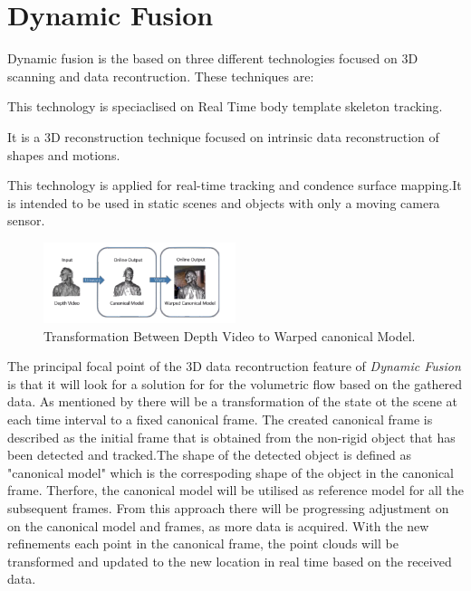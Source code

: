 \documentclass[12pt]{report}
\begin{document}
\section{Dynamic Fusion}
Dynamic fusion is the based on three different technologies focused on 3D scanning and data recontruction. These techniques are: 

\begin{description}[style=nextline]
    \item[DART (Dense Articulated Real Time Tracking)] This technology is speciaclised  on Real Time body template skeleton tracking.
    \item[Animation Cartography] It is a 3D reconstruction technique  focused on intrinsic data reconstruction of shapes and motions. 
    \item[Kinect Fusion] This technology is applied for real-time tracking and condence surface mapping.It is intended to be used in static scenes and objects with only a moving camera sensor. 
\end{description} 

\vspace{5mm}

\begin{figure} %
    \centering
    \includegraphics[width=0.5\textwidth]{IMG_0073.png}
    \caption{Transformation Between Depth Video to Warped canonical Model. \cite[]{newcombe_fox_seitz_2015}}
\end{figure}
The principal  focal point of the 3D data recontruction feature of \textit{Dynamic Fusion}  is that it will look for a solution for for the volumetric flow based on the gathered data.
As mentioned by  there will be a transformation of the state ot the scene at each time interval to a fixed canonical frame.
The created  canonical frame is described as the initial frame that is obtained from the non-rigid object that has been detected and tracked.The shape of the detected object is defined as "canonical model" which is the correspoding shape of the object in the canonical frame. 
Therfore, the canonical model will be utilised as reference model for all the subsequent frames. From this approach there will be progressing adjustment on on the canonical model and frames, as more data is acquired.
With the new refinements each point in the canonical frame, the point clouds will be transformed and updated to the new location in real time based on the received data.
\end{document}
